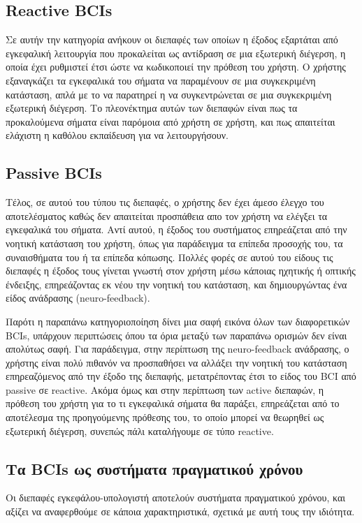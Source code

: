 \documentclass[11pt,a4paper,english,greek,twoside]{../Thesis}
\begin{document}
  \subsection{Reactive BCIs}
  \par Σε αυτήν την κατηγορία ανήκουν οι διεπαφές των οποίων η έξοδος εξαρτάται από εγκεφαλική λειτουργία που προκαλείται ως αντίδραση σε μια εξωτερική διέγερση, η οποία έχει ρυθμιστεί έτσι ώστε να κωδικοποιεί την πρόθεση του χρήστη. Ο χρήστης εξαναγκάζει τα εγκεφαλικά του σήματα να παραμένουν σε μια συγκεκριμένη κατάσταση, απλά με το να παρατηρεί η να συγκεντρώνεται σε μια συγκεκριμένη εξωτερική διέγερση. Το πλεονέκτημα αυτών των διεπαφών είναι πως τα προκαλούμενα σήματα είναι παρόμοια από χρήστη σε χρήστη, και πως απαιτείται ελάχιστη η καθόλου εκπαίδευση για να λειτουργήσουν.

  \subsection{Passive BCIs}
  \par Τέλος, σε αυτού του τύπου τις διεπαφές, ο χρήστης δεν έχει άμεσο έλεγχο του αποτελέσματος καθώς δεν απαιτείται προσπάθεια απο τον χρήστη να ελέγξει τα εγκεφαλικά του σήματα. Αντί αυτού, η έξοδος του συστήματος επηρεάζεται από την νοητική κατάσταση του χρήστη, όπως για παράδειγμα τα επίπεδα προσοχής του, τα συναισθήματα του ή τα επίπεδα κόπωσης. Πολλές φορές σε αυτού του είδους τις διεπαφές η έξοδος τους γίνεται γνωστή στον χρήστη μέσω κάποιας ηχητικής ή οπτικής ένδειξης, επηρεάζοντας εκ νέου την νοητική του κατάσταση, και δημιουργώντας ένα είδος ανάδρασης (neuro-feedback). 
  
  \par Παρότι η παραπάνω κατηγοριοποίηση δίνει μια σαφή εικόνα όλων των διαφορετικών BCIs, υπάρχουν περιπτώσεις όπου τα όρια μεταξύ των παραπάνω ορισμών δεν είναι απολύτως σαφή. Για παράδειγμα, στην περίπτωση της neuro-feedback ανάδρασης, ο χρήστης είναι πολύ πιθανόν να προσπαθήσει να αλλάξει την νοητική του κατάσταση επηρεαζόμενος από την έξοδο της διεπαφής, μετατρέποντας έτσι το είδος του BCI από passive σε reactive. Ακόμα όμως και στην περίπτωση των active διεπαφών, η πρόθεση του χρήστη για το τι εγκεφαλικά σήματα θα παράξει, επηρεάζεται από το αποτέλεσμα της προηγούμενης πρόθεσης του, το οποίο μπορεί να θεωρηθεί ως εξωτερική διέγερση, συνεπώς πάλι καταλήγουμε σε τύπο reactive. 

\subsection{Τα BCIs ως συστήματα πραγματικού χρόνου}
\label{subsec:bci_as_rt}
\par Οι διεπαφές εγκεφάλου-υπολογιστή αποτελούν συστήματα πραγματικού χρόνου, και αξίζει να αναφερθούμε σε κάποια χαρακτηριστικά, σχετικά με αυτή τους την ιδιότητα.
\end{document}
